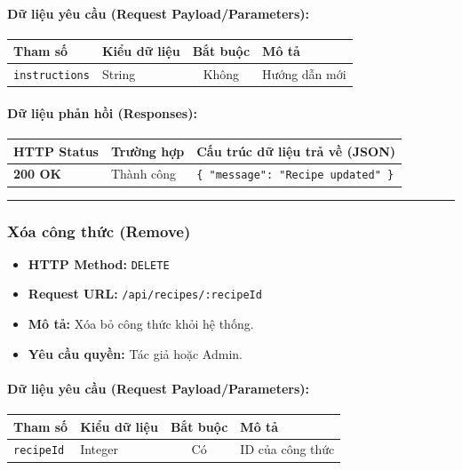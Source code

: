 \documentclass[12pt,a4paper]{article}
\begin{document}
\paragraph{Dữ liệu yêu cầu (Request Payload/Parameters):}
\begin{longtable}{|p{2.8cm}|p{2.2cm}|c|p{7.0cm}|}
\hline
\textbf{Tham số} & \textbf{Kiểu dữ liệu} & \textbf{Bắt buộc} & \textbf{Mô tả} \\ \hline
\endhead
\texttt{instructions} & String & Không & Hướng dẫn mới \\ \hline
\end{longtable}

\paragraph{Dữ liệu phản hồi (Responses):}
\begin{longtable}{|p{2.8cm}|p{3.2cm}|p{8.0cm}|}
\hline
\textbf{HTTP Status} & \textbf{Trường hợp} & \textbf{Cấu trúc dữ liệu trả về (JSON)} \\ \hline
\endhead
\textbf{200 OK} & Thành công & \texttt{\{ "message": "Recipe updated" \}} \\ \hline
\end{longtable}

\vskip 0.4cm
\noindent\rule{\textwidth}{0.3pt}
\vskip 0.4cm

\subsubsection{Xóa công thức (Remove)}
\begin{itemize}[leftmargin=*]
    \item \textbf{HTTP Method:} \texttt{DELETE}
    \item \textbf{Request URL:} \texttt{/api/recipes/:recipeId}
    \item \textbf{Mô tả:} Xóa bỏ công thức khỏi hệ thống.
    \item \textbf{Yêu cầu quyền:} Tác giả hoặc Admin.
\end{itemize}

\paragraph{Dữ liệu yêu cầu (Request Payload/Parameters):}
\begin{longtable}{|p{2.8cm}|p{2.2cm}|c|p{7.0cm}|}
\hline
\textbf{Tham số} & \textbf{Kiểu dữ liệu} & \textbf{Bắt buộc} & \textbf{Mô tả} \\ \hline
\endhead
\texttt{recipeId} & Integer & Có & ID của công thức \\ \hline
\end{longtable}
\end{document}
